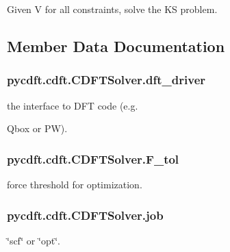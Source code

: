 Given V for all constraints, solve the K\-S problem. 



\subsection{Member Data Documentation}
\hypertarget{classpycdft_1_1cdft_1_1CDFTSolver_a6fdf43a1aa722ae015cc3338bac8cdbf}{
\subsubsection[{dft\-\_\-driver}]{\setlength{\rightskip}{0pt plus 5cm}pycdft.\-cdft.\-C\-D\-F\-T\-Solver.\-dft\-\_\-driver}}\label{classpycdft_1_1cdft_1_1CDFTSolver_a6fdf43a1aa722ae015cc3338bac8cdbf}


the interface to D\-F\-T code (e.\-g. 

Qbox or P\-W). \hypertarget{classpycdft_1_1cdft_1_1CDFTSolver_a2e23d3524341dfa49edb1c922b7ea76d}{
\subsubsection[{F\-\_\-tol}]{\setlength{\rightskip}{0pt plus 5cm}pycdft.\-cdft.\-C\-D\-F\-T\-Solver.\-F\-\_\-tol}}\label{classpycdft_1_1cdft_1_1CDFTSolver_a2e23d3524341dfa49edb1c922b7ea76d}


force threshold for optimization. 

\hypertarget{classpycdft_1_1cdft_1_1CDFTSolver_a0dbb216ba260e5fe5ac2d12af5972291}{
\subsubsection[{job}]{\setlength{\rightskip}{0pt plus 5cm}pycdft.\-cdft.\-C\-D\-F\-T\-Solver.\-job}}\label{classpycdft_1_1cdft_1_1CDFTSolver_a0dbb216ba260e5fe5ac2d12af5972291}


\char`\"{}scf\char`\"{} or \char`\"{}opt\char`\"{}. 

